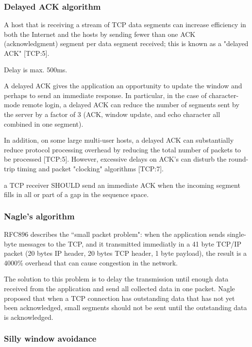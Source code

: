 \subsubsection*{Delayed ACK algorithm}


A host that is receiving a stream of TCP data segments can
increase efficiency in both the Internet and the hosts by
sending fewer than one ACK (acknowledgment) segment per data
segment received; this is known as a "delayed ACK" [TCP:5].

Delay is max. 500ms.

A delayed ACK gives the application an opportunity to
update the window and perhaps to send an immediate
response.  In particular, in the case of character-mode
remote login, a delayed ACK can reduce the number of
segments sent by the server by a factor of 3 (ACK,
window update, and echo character all combined in one
segment).

In addition, on some large multi-user hosts, a delayed
ACK can substantially reduce protocol processing
overhead by reducing the total number of packets to be
processed [TCP:5].  However, excessive delays on ACK's
can disturb the round-trip timing and packet "clocking"
algorithms [TCP:7].


a TCP receiver SHOULD send an immediate ACK
when the incoming segment fills in all or part of a gap in the
sequence space.

\subsubsection*{Nagle's algorithm}

RFC896 describes the ``small packet problem": when the application
sends single-byte messages to the TCP, and it transmitted immediatly
in a 41 byte TCP/IP packet (20 bytes IP header, 20 bytes TCP header,
1 byte payload), the result is a 4000\% overhead that can cause
congestion in the network.

The solution to this problem is to delay the transmission until
enough data received from the application and send all collected
data in one packet. Nagle proposed that
when a TCP connection has outstanding data that has not
yet been acknowledged, small segments should not be sent
until the outstanding data is acknowledged.

\subsubsection*{Silly window avoidance}


